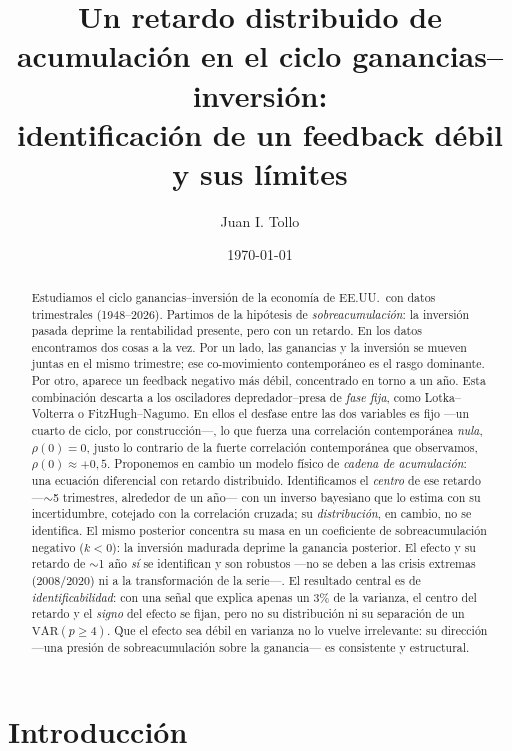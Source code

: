 \documentclass[11pt]{article}
\title{\vspace{-1.2cm}Un retardo distribuido de acumulación en el ciclo ganancias--inversión:\\
identificación de un feedback débil y sus límites}
\author{Juan I. Tollo}
\date{\today}
\begin{document}
\maketitle
\vspace{-0.7cm}

\begin{abstract}
\noindent
Estudiamos el ciclo ganancias--inversión de la economía de EE.UU.\ con datos trimestrales
(1948--2026). Partimos de la hipótesis de \emph{sobreacumulación}: la inversión pasada deprime la
rentabilidad presente, pero con un retardo. En los datos encontramos dos cosas a la vez. Por un
lado, las ganancias y la inversión se mueven juntas en el mismo trimestre; ese co-movimiento
contemporáneo es el rasgo dominante. Por otro, aparece un feedback negativo más débil, concentrado
en torno a un año. Esta combinación descarta a los osciladores depredador--presa de \emph{fase
fija}, como Lotka--Volterra o FitzHugh--Nagumo. En ellos el desfase entre las dos variables es fijo
---un cuarto de ciclo, por construcción---, lo que fuerza una correlación contemporánea \emph{nula},
$\rho(0)=0$, justo lo contrario de la fuerte correlación contemporánea que observamos,
$\rho(0)\approx+0{,}5$. Proponemos en cambio un modelo físico de \emph{cadena de acumulación}: una
ecuación diferencial con retardo distribuido. Identificamos el \emph{centro} de ese retardo ---$\sim$5 trimestres, alrededor de un año--- con un
inverso bayesiano que lo estima con su incertidumbre, cotejado con la correlación cruzada; su
\emph{distribución}, en cambio, no se identifica. El mismo posterior concentra su
masa en un coeficiente de sobreacumulación negativo ($k<0$): la inversión madurada deprime la
ganancia posterior. El efecto y su retardo de $\sim$1 año \emph{sí} se identifican y son robustos
---no se deben a las crisis extremas (2008/2020) ni a la transformación de la serie---.
El resultado central es de \emph{identificabilidad}: con una señal que explica apenas un 3\% de la
varianza, el centro del retardo y el \emph{signo} del efecto se fijan, pero no su distribución ni su separación de un
$\mathrm{VAR}(p\!\ge\!4)$. Que el efecto sea débil en varianza no lo vuelve irrelevante: su dirección ---una presión de sobreacumulación sobre la ganancia--- es consistente y estructural.
\end{abstract}

\section{Introducción}
\end{document}
